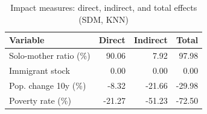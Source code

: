 \begin{table}[ht]
\centering
\caption{Impact measures: direct, indirect, and total effects (SDM, KNN)} 
\label{tab:impacts}
\begin{tabular}{lrrr}
  \toprule
Variable & Direct & Indirect & Total \\ 
  \midrule
Solo-mother ratio (\%) & 90.06 & 7.92 & 97.98 \\ 
  Immigrant stock & 0.00 & 0.00 & 0.00 \\ 
  Pop. change 10y (\%) & -8.32 & -21.66 & -29.98 \\ 
  Poverty rate (\%) & -21.27 & -51.23 & -72.50 \\ 
   \bottomrule
\end{tabular}
\end{table}
